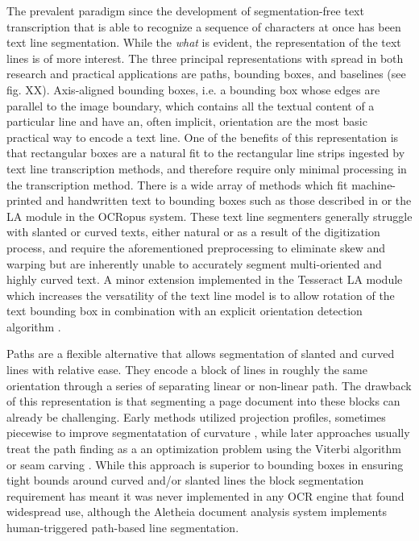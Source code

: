 The prevalent paradigm since the development of segmentation-free text
transcription that is able to recognize a sequence of characters at once has
been text line segmentation. While the \emph{what} is evident, the
representation of the text lines is of more interest. The three principal
representations with spread in both research and practical applications are
paths, bounding boxes, and baselines (see fig. XX). Axis-aligned bounding
boxes, i.e. a bounding box whose edges are parallel to the image boundary,
which contains all the textual content of a particular line and have an, often
implicit, orientation are the most basic practical way to encode a text line.
One of the benefits of this representation is that rectangular boxes are a
natural fit to the rectangular line strips ingested by text line transcription
methods, and therefore require only minimal processing in the transcription
method. There is a wide array of methods which fit machine-printed and
handwritten text to bounding boxes such as those described in
\cite{marti2001influence,papavassiliou2010handwritten} or the LA module in the
OCRopus system\cite{Breuel03highperformance}. These text line segmenters
generally struggle with slanted or curved texts, either natural or as a result
of the digitization process, and require the aforementioned preprocessing to
eliminate skew and warping but are inherently unable to accurately segment
multi-oriented and highly curved text. A minor extension implemented in the
Tesseract LA module which increases the versatility of the text line model is
to allow rotation of the text bounding box in combination with an explicit
orientation detection algorithm \cite{smith2007overview}.

Paths are a flexible alternative that allows segmentation of slanted and curved
lines with relative ease. They encode a block of lines in roughly the same
orientation through a series of separating linear or non-linear path. The
drawback of this representation is that segmenting a page document into
these blocks can already be challenging. Early methods utilized projection
profiles\cite{antonacopoulos2004document}, sometimes piecewise to improve
segmentatation of curvature \cite{zahour2001arabic}, while later approaches
usually treat the path finding as a an optimization problem using the Viterbi
algorithm\cite{tseng1999recognition} or seam carving
\cite{arvanitopoulos2014seam,zhang2014text}. While this approach is superior to
bounding boxes in ensuring tight bounds around curved and/or slanted lines the
block segmentation requirement has meant it was never implemented in any OCR
engine that found widespread use, although the Aletheia\cite{6065274} document
analysis system implements human-triggered path-based line segmentation.

